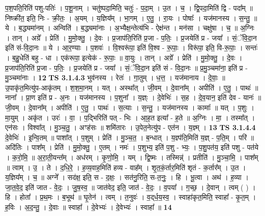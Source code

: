 \documentclass[17pt]{extarticle}
\begin{document}
                  प॒श॒पति॒रिति॑ पशु-पतिः॑ । प॒शू॒नाम् । चतु॑ष्पदा॒मिति॒ चतुः॑ - प॒दा॒म् । उ॒त । च॒ । द्वि॒पदा॒मिति॑ द्वि - पदा᳚म् ॥ निष्क्री॑त॒ इति॒ निः - क्री॒तः॒ । अ॒यम् । य॒ज्ञिय᳚म् । भा॒गम् । ए॒तु॒ । रा॒यः । पोषाः᳚ । यज॑मानस्य । स॒न्तु॒ ॥ ये । ब॒द्ध्यमा॑नम् । अन्विति॑ । ब॒द्ध्यमा॑नाः । अ॒भ्यैक्ष॒न्तेत्य॑भि - ऐक्ष॑न्त । मन॑सा । चक्षु॑षा । च॒ ॥ अ॒ग्निः । तान् । अग्रे᳚ । प्रेति॑ । मु॒मो॒क्तु॒ । दे॒वः । प्र॒जाप॑ति॒रिति॑ प्र॒जा - प॒तिः॒ । प्र॒जयेति॑ प्र - जया᳚ । सं॒ॅवि॒दा॒न इति॑ सं-वि॒दा॒नः ॥ ये । आ॒र॒ण्याः । प॒शवः॑ । वि॒श्वरू॑पा॒ इति॑ वि॒श्व - रू॒पाः॒ । विरू॑पा॒ इति॒ वि-रू॒पाः॒ । सन्तः॑ । ब॒हु॒धेति॑ बहु - धा । एक॑रूपा॒ इत्येक॑ - रू॒पाः॒ ॥ वा॒युः । तान् । अग्रे᳚ । प्रेति॑ । मु॒मो॒क्तु॒ । दे॒वः । प्र॒जाप॑ति॒रिति॑ प्र॒जा - प॒तिः॒ । प्र॒जयेति॑ प्र - जया᳚ । सं॒ॅवि॒दा॒न इति॑ सं - वि॒दा॒नः ॥ प्र॒मु॒ञ्चमा॑ना॒ इति॑ प्र - मु॒ञ्चमा॑नाः । \textbf{  12} \newline
                  \newline
                                \textbf{ TS 3.1.4.3} \newline
                  भुव॑नस्य । रेतः॑ । गा॒तुम् । ध॒त्त॒ । यज॑मानाय । दे॒वाः॒ ॥ उ॒पाकृ॑त॒मित्यु॑प-आकृ॑तम् । श॒श॒मा॒नम् । यत् । अस्था᳚त् । जी॒वम् । दे॒वाना᳚म् । अपीति॑ । ए॒तु॒ । पाथः॑ ॥ नाना᳚ । प्रा॒ण इति॑ प्र - अ॒नः । यज॑मानस्य । प॒शुना᳚ । य॒ज्ञ्ः । दे॒वेभिः॑ । स॒ह । दे॒व॒यान॒ इति॑ देव - यानः॑ ॥ जी॒वम् । दे॒वाना᳚म् । अपीति॑ । ए॒तु॒ । पाथः॑ । स॒त्याः । स॒न्तु॒ । यज॑मानस्य । कामाः᳚ ॥ यत् । प॒शुः । मा॒युम् । अकृ॑त । उरः॑ । वा॒ । प॒द्भिरिति॑ पत् - भिः । आ॒ह॒त इत्या᳚ - ह॒ते ॥ अ॒ग्निः । मा॒ । तस्मा᳚त् । एन॑सः । विश्वा᳚त् । मु॒ञ्च॒तु॒ । अꣳह॑सः ॥ शमि॑तारः । उ॒पेत॒नेत्यु॑प - एत॑न । य॒ज्ञ्म् । \textbf{  13} \newline
                  \newline
                                \textbf{ TS 3.1.4.4} \newline
                  दे॒वेभिः॑ । इ॒न्वि॒तम् ॥ पाशा᳚त् । प॒शुम् । प्रेति॑ । मु॒ञ्च॒त॒ । ब॒न्धात् । य॒ज्ञ्प॑ति॒मिति॑ य॒ज्ञ् - प॒ति॒म् । परि॑ ॥ अदि॑तिः । पाश᳚म् । प्रेति॑ । मु॒मो॒क्तु॒ । ए॒तम् । नमः॑ । प॒शुभ्य॒ इति॑ प॒शु - भ्यः॒ । प॒शु॒पत॑य॒ इति॑ पशु - पत॑ये । क॒रो॒मि॒ ॥ अ॒रा॒ती॒यन्त᳚म् । अध॑रम् । कृ॒णो॒मि॒ । यम् । द्वि॒ष्मः । तस्मिन्न्॑ । प्रतीति॑ । मु॒ञ्चा॒मि॒ । पाश᳚म् ॥ त्वाम् । उ॒ । ते । द॒धि॒रे॒ । ह॒व्य॒वाह॒मिति॑ हव्य - वाह᳚म् । शृ॒त॒कं॒र्तार॒मिति॑ शृतं - क॒र्तार᳚म् । उ॒त । य॒ज्ञिय᳚म् । च॒ ॥ अग्ने᳚ । सद॑क्ष॒ इति॒ स - द॒क्षः॒ । सत॑नु॒रिति॒ स-त॒नुः॒ । हि । भू॒त्वा । अथ॑ । ह॒व्या । जा॒त॒वे॒द॒ इति॑ जात - वे॒दः॒ । जु॒ष॒स्व॒ ॥ जात॑वेद॒ इति॒ जात॑ - वे॒दः॒ । व॒पया᳚ । ग॒च्छ॒ । दे॒वान् । त्वम् ( ) । हि । होता᳚ । प्र॒थ॒मः । ब॒भूथ॑ ॥ घृ॒तेन॑ । त्वम् । त॒नुवः॑ । व॒द्‌र्ध॒य॒स्व॒ । स्वाहा॑कृत॒मिति॒ स्वाहा᳚ - कृ॒त॒म् । ह॒विः । अ॒द॒न्तु॒ । दे॒वाः ॥ स्वाहा᳚ । दे॒वेभ्यः॑ । दे॒वेभ्यः॑ । स्वाहा᳚ ॥ \textbf{  14} \newline
\end{document}
